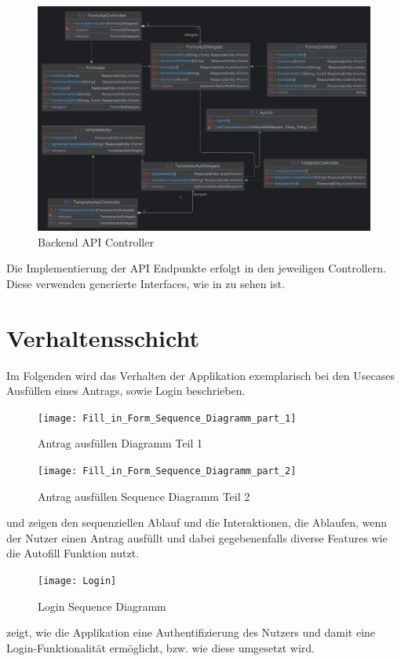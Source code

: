 \begin{figure}[H]
    \centering
    \includegraphics[width=15cm]{images/classDiagrams/Api}
    \caption{Backend \ac{API} Controller}\label{fig:Backend-API-Controller}
\end{figure}

Die Implementierung der \ac{API} Endpunkte erfolgt in den jeweiligen Controllern.
Diese verwenden generierte Interfaces, wie in  zu sehen ist.


\section{Verhaltensschicht}\label{sec:verhaltensschicht}
Im Folgenden wird das Verhalten der Applikation exemplarisch bei den Usecases Ausfüllen 
eines Antrags, sowie Login beschrieben.

\begin{figure}[H]
    \texttt{[image: Fill\_in\_Form\_Sequence\_Diagramm\_part\_1]}
    \caption{Antrag ausfüllen Diagramm Teil 1}\label{fig:Antrag Flow 1}
\end{figure}   
\begin{figure}[H]
    \texttt{[image: Fill\_in\_Form\_Sequence\_Diagramm\_part\_2]}
    \caption{Antrag ausfüllen Sequence Diagramm Teil 2}\label{fig:Antrag Flow 2}
\end{figure}
 und  zeigen den sequenziellen Ablauf 
und die Interaktionen, die Ablaufen, wenn der Nutzer einen Antrag ausfüllt und dabei 
gegebenenfalls diverse Features wie die Autofill Funktion nutzt.
\begin{figure}[H]
    \texttt{[image: Login]}
    \caption{Login Sequence Diagramm}\label{fig:Login Flow}
\end{figure}
 zeigt, wie die Applikation eine Authentifizierung des Nutzers und damit 
eine Login-Funktionalität ermöglicht, bzw. wie diese umgesetzt wird.


